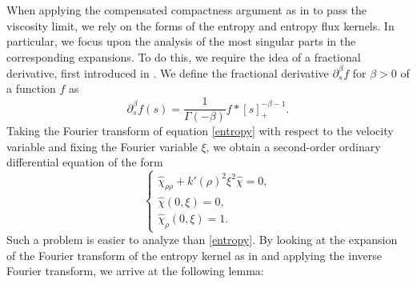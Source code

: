 \documentclass[reqno,11pt]{amsart}
\numberwithin{equation}{section}
\theoremstyle{definition}
\begin{document}
When applying the compensated compactness argument as in \cite{Schrecker_2019} 
to pass the viscosity limit, 
we rely on the forms of the entropy and entropy flux kernels. 
In particular, we focus upon the analysis of the most singular parts in the corresponding expansions. 
To do this, we require the idea of a fractional derivative,
first introduced in \cite{Chen_1986,DCL_1985}.
We define the fractional derivative $\partial_s^\beta f$ for $\beta > 0$ of a function $f$ as
    \begin{equation*}
  \partial_s^\beta f(s) = \frac{1}{\Gamma(-\beta)} f*[s]_+^{-\beta - 1}.
    \end{equation*}
Taking the Fourier transform of equation \eqref{entropy} with respect to the velocity variable 
and fixing the Fourier variable $\xi$, we obtain a second-order ordinary differential equation 
of the form
    \begin{equation*}
     \begin{cases}
       \hat{\chi}_{\rho \rho} + k'(\rho)^2 \xi^2 \hat{\chi} = 0, \\
      \hat{\chi}(0,\xi) = 0, \\
     \hat{\chi}_\rho(0,\xi) = 1.
\end{cases}
    \end{equation*}
Such a problem is easier to analyze than \eqref{entropy}. 
By looking at the expansion of the Fourier transform of the entropy kernel as in \cite{Chen_2000,Chen_2003,Chen_2024} and applying the inverse Fourier transform, 
we arrive at the following lemma:
\end{document}
